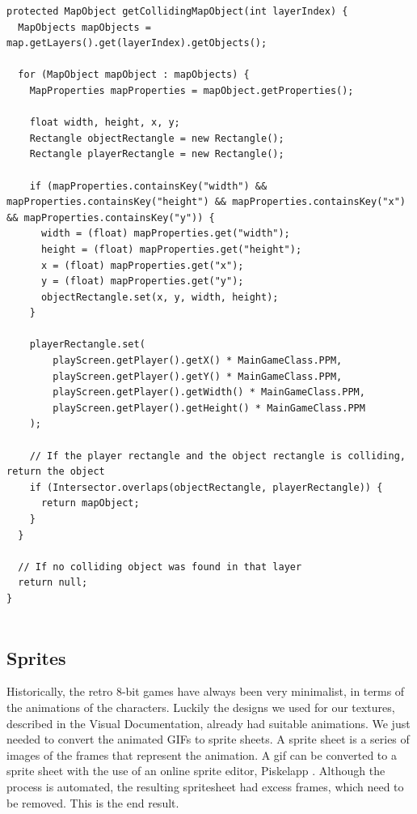\documentclass[12p]{article}
\begin{document}
\begin{verbatim}
protected MapObject getCollidingMapObject(int layerIndex) {
  MapObjects mapObjects = map.getLayers().get(layerIndex).getObjects();

  for (MapObject mapObject : mapObjects) {
    MapProperties mapProperties = mapObject.getProperties();

    float width, height, x, y;
    Rectangle objectRectangle = new Rectangle();
    Rectangle playerRectangle = new Rectangle();

    if (mapProperties.containsKey("width") && mapProperties.containsKey("height") && mapProperties.containsKey("x") && mapProperties.containsKey("y")) {
      width = (float) mapProperties.get("width");
      height = (float) mapProperties.get("height");
      x = (float) mapProperties.get("x");
      y = (float) mapProperties.get("y");
      objectRectangle.set(x, y, width, height);
    }

    playerRectangle.set(
        playScreen.getPlayer().getX() * MainGameClass.PPM,
        playScreen.getPlayer().getY() * MainGameClass.PPM,
        playScreen.getPlayer().getWidth() * MainGameClass.PPM,
        playScreen.getPlayer().getHeight() * MainGameClass.PPM
    );

    // If the player rectangle and the object rectangle is colliding, return the object
    if (Intersector.overlaps(objectRectangle, playerRectangle)) {
      return mapObject;
    }
  }

  // If no colliding object was found in that layer
  return null;
}
  
\end{verbatim}


\newpage
\subsection{Sprites} \label{DocSprites}

Historically, the retro 8-bit games have always been very minimalist, in terms of the animations of the characters. Luckily the designs we used for our textures, described in the Visual Documentation, already had suitable animations. We just needed to convert the animated GIFs to sprite sheets. A sprite sheet is a series of images of the frames that represent the animation. A gif can be converted to a sprite sheet with the use of an online sprite editor, Piskelapp \cite{piskelapp}. Although the process is automated, the resulting spritesheet had excess frames, which need to be removed. This is the end result.
\end{document}
